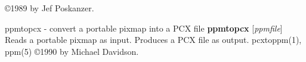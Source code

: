 \copyright 1989 by Jef Poskanzer.
%
%
 
%

\newpage
%

ppmtopcx - convert a portable pixmap into a PCX file
{\bf ppmtopcx}
{\rm [}{\it ppmfile}{\rm ]}
Reads a portable pixmap as input.
Produces a PCX file as output.
pcxtoppm(1), ppm(5)
\copyright 1990 by Michael Davidson.
%
 
%

\newpage
%

